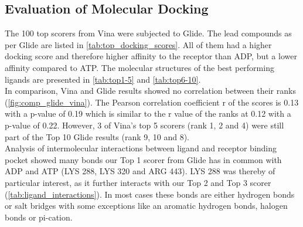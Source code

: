 \documentclass[11pt, letterpaper, titlepage]{article}
\begin{document}
\FloatBarrier

\subsection{Evaluation of Molecular Docking}
The 100 top scorers from Vina were subjected to Glide. The lead compounds as per Glide are listed in \autoref{tab:top_docking_scores}. All of them had a higher docking score and therefore higher affinity to the receptor than ADP, but a lower affinity compared to ATP. The molecular structures of the best performing ligands are presented in \autoref{tab:top1-5} and \ref{tab:top6-10}.\\
In comparison, Vina and Glide results showed no correlation between their ranks (\autoref{fig:comp_glide_vina}). The Pearson correlation coefficient r of the scores is 0.13 with a p-value of 0.19 which is similar to the r value of the ranks at 0.12 with a p-value of 0.22. However, 3 of Vina's top 5 scorers (rank 1, 2 and 4) were still part of the Top 10 Glide results (rank 9, 10 and 8). \\
Analysis of intermolecular interactions between ligand and receptor binding pocket showed many bonds our Top 1 scorer from Glide has in common with ADP and ATP (LYS 288, LYS 320 and ARG 443). LYS 288 was thereby of particular interest, as it further interacts with our Top 2 and Top 3 scorer (\autoref{tab:ligand_interactions}). In most cases these bonds are either hydrogen bonds or salt bridges with some exceptions like an aromatic hydrogen bonds, halogen bonds or pi-cation.
%

\end{document}
